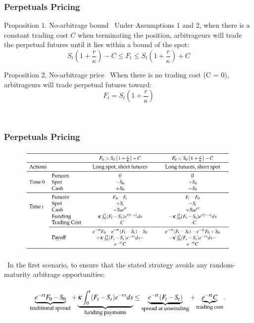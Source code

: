 \documentclass{beamer}
\begin{document}
\begin{frame}
\frametitle{Perpetuals Pricing}
\begin{alertblock}{Proposition 1. No-arbitrage bound}
~Under Assumptions 1 and 2, when there is a constant trading cost $C$ when terminating the position, arbitrageurs will trade the perpetual futures until it lies within a bound of the spot:$$S_t(1+\frac{r}{\kappa})-C\leq F_t\leq S_t(1+\frac{r}{\kappa})+C$$
\end{alertblock}
\begin{alertblock}{Proposition 2. No-arbitrage price}
~When there is no trading cost (C = 0), arbitrageurs will trade perpetual futures toward: $$F_t = S_t\left(1+\frac{r}{\kappa}\right)$$
\end{alertblock}
~\\
\end{frame}

\begin{frame}
\frametitle{Perpetuals Pricing}
\begin{figure}
\includegraphics[scale=0.8]{figs/Table1.png}
\end{figure}
~In the first scenario, to ensure that the stated strategy avoids any random-maturity arbitrage opportunities:
\begin{figure}
\includegraphics[scale=0.9]{figs/Equation(2).png}
\end{figure}
\end{frame}
\end{document}

